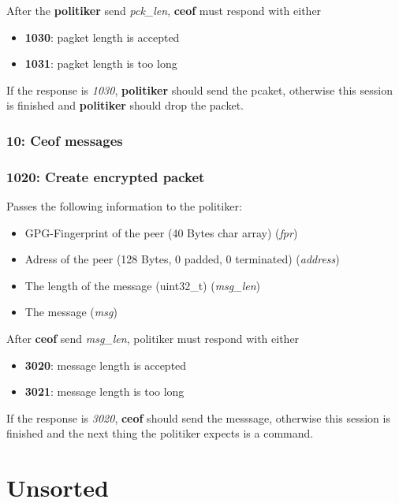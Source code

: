 \documentclass[12pt,a4paper]{book}
\begin{document}
After the \textbf{politiker} send \textit{pck\_len},
\textbf{ceof} must respond with either
\begin{itemize}
\item \textbf{1030}: pagket length is accepted
\item \textbf{1031}: pagket length is too long
\end{itemize}

If the response is \textit{1030}, \textbf{politiker} should send the
pcaket, otherwise this session is finished and \textbf{politiker}
should drop the packet.
\subsection{10: Ceof messages}
\subsection{1020: Create encrypted packet}
Passes the following information to the politiker:
\begin{itemize}
\item GPG-Fingerprint of the peer (40 Bytes char array) (\textit{fpr})
\item Adress of the peer (128 Bytes, 0 padded, 0 terminated) (\textit{address})
\item The length of the message (uint32\_t) (\textit{msg\_len})
\item The message (\textit{msg})
\end{itemize}

After \textbf{ceof} send \textit{msg\_len}, politiker must respond with
either
\begin{itemize}
\item \textbf{3020}: message length is accepted
\item \textbf{3021}: message length is too long
\end{itemize}

If the response is \textit{3020}, \textbf{ceof} should send the messsage,
otherwise this session is finished and the next thing the politiker expects
is a command.

\chapter{Unsorted}
\end{document}
